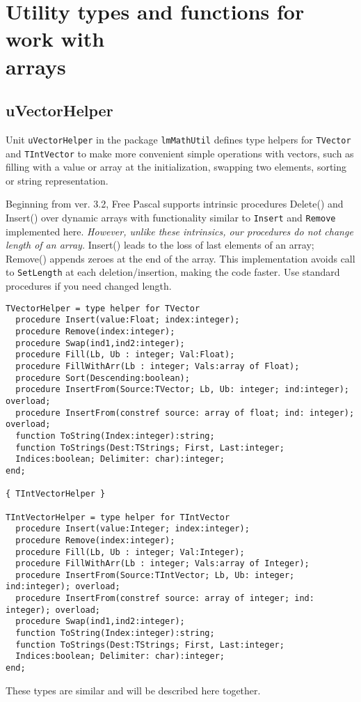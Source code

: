 \documentclass[12pt,a4paper,oneside]{article}
\newcommand{\code}[1]{\texttt{#1}}
\begin{document}
\section[Utility types and functions for work with arrays]{Utility types and functions for work with\\ arrays}
\subsection{uVectorHelper}
Unit \code{uVectorHelper} in the package \code{lmMathUtil} defines type helpers for \code{TVector} and \code{TIntVector} to make more convenient simple operations with vectors, such as filling with a value or array at the initialization, swapping two elements, sorting or string representation.

Beginning from ver. 3.2, Free Pascal supports intrinsic procedures Delete() and Insert() over dynamic arrays with functionality similar to \code{Insert} and \code{Remove} implemented here. \textit{However, unlike these intrinsics, our procedures do not change length of an array.} Insert() leads to the loss of last elements of an array; Remove() appends zeroes at the end of the array. This implementation avoids call to \code{SetLength} at each deletion/insertion, making the code faster. Use standard procedures if you need changed length.     
\begin{verbatim}
TVectorHelper = type helper for TVector
  procedure Insert(value:Float; index:integer);
  procedure Remove(index:integer);
  procedure Swap(ind1,ind2:integer);
  procedure Fill(Lb, Ub : integer; Val:Float);
  procedure FillWithArr(Lb : integer; Vals:array of Float);
  procedure Sort(Descending:boolean);
  procedure InsertFrom(Source:TVector; Lb, Ub: integer; ind:integer); overload;
  procedure InsertFrom(constref source: array of float; ind: integer); overload;
  function ToString(Index:integer):string;
  function ToStrings(Dest:TStrings; First, Last:integer;
  Indices:boolean; Delimiter: char):integer;
end;

{ TIntVectorHelper }

TIntVectorHelper = type helper for TIntVector
  procedure Insert(value:Integer; index:integer);
  procedure Remove(index:integer);
  procedure Fill(Lb, Ub : integer; Val:Integer);
  procedure FillWithArr(Lb : integer; Vals:array of Integer);
  procedure InsertFrom(Source:TIntVector; Lb, Ub: integer; ind:integer); overload;
  procedure InsertFrom(constref source: array of integer; ind: integer); overload;
  procedure Swap(ind1,ind2:integer);
  function ToString(Index:integer):string;
  function ToStrings(Dest:TStrings; First, Last:integer;
  Indices:boolean; Delimiter: char):integer;
end;
\end{verbatim}
These types are similar and will be described here together.
\end{document}
